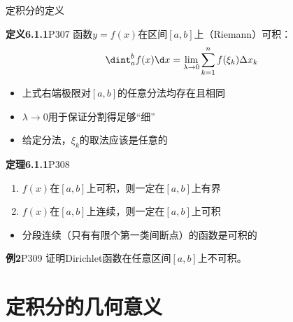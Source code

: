 \begin{frame}{定积分的定义}
	\linespread{1.2}\pause 
	\begin{block}{{\bf 定义6.1.1}\hfill P307}
		{\bb 函数$y=f(x)$在区间$[a,b]$上（Riemann）可积：}\pause 
		$$\dint_a^bf(x)\d x=\lim\limits_{\lambda\to
		0}\sum\limits_{k=1}^nf(\xi_k)\Delta x_k$$
	\end{block}\pause 
	\begin{itemize}
	  \item \alert{上式右端极限对$[a,b]$的任意分法均存在且相同}\pause 
	  \item \alert{$\lambda\to 0$用于保证分割得足够“细”}\pause 
	  \item \alert{给定分法，$\xi_k$的取法应该是任意的}
	\end{itemize}
\end{frame}

\begin{frame}
	\linespread{1.2}\pause 
	\begin{block}{{\bf 定理6.1.1}\hfill P308}
		\begin{enumerate}
		  \item $f(x)$在$[a,b]$上可积，则一定在$[a,b]$上有界\pause 
		  \item $f(x)$在$[a,b]$上连续，则一定在$[a,b]$上可积\pause 
		\end{enumerate}
	\end{block}
	\begin{itemize}
	  \item \alert{分段连续（只有有限个第一类间断点）的函数是可积的}
	\end{itemize}\pause 
	\begin{exampleblock}{{\bf 例2}\hfill P309}
		证明Dirichlet函数在任意区间$[a,b]$上不可积。
	\end{exampleblock}
\end{frame}

\section{定积分的几何意义}

